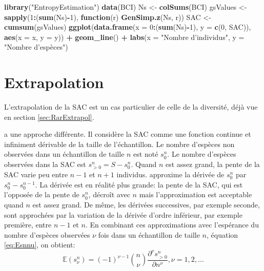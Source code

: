 \documentclass[
  11pt,
  french,
  a4paper,
  extrafontsizes,onecolumn,openright
  ]{memoir}
\newenvironment{Shaded}{\begin{snugshade}}{\end{snugshade}}
\newcommand{\ControlFlowTok}[1]{\textcolor[rgb]{0.13,0.29,0.53}{\textbf{#1}}}
\newcommand{\DataTypeTok}[1]{\textcolor[rgb]{0.13,0.29,0.53}{#1}}
\newcommand{\DecValTok}[1]{\textcolor[rgb]{0.00,0.00,0.81}{#1}}
\newcommand{\KeywordTok}[1]{\textcolor[rgb]{0.13,0.29,0.53}{\textbf{#1}}}
\newcommand{\NormalTok}[1]{#1}
\newcommand{\OperatorTok}[1]{\textcolor[rgb]{0.81,0.36,0.00}{\textbf{#1}}}
\newcommand{\StringTok}[1]{\textcolor[rgb]{0.31,0.60,0.02}{#1}}
\begin{document}
\scriptsize

\begin{Shaded}
\begin{Highlighting}[]
\KeywordTok{library}\NormalTok{(}\StringTok{"EntropyEstimation"}\NormalTok{)}
\KeywordTok{data}\NormalTok{(BCI)}
\NormalTok{Ns <-}\StringTok{ }\KeywordTok{colSums}\NormalTok{(BCI)}
\NormalTok{gsValues <-}\StringTok{ }\KeywordTok{sapply}\NormalTok{(}\DecValTok{1}\OperatorTok{:}\NormalTok{(}\KeywordTok{sum}\NormalTok{(Ns)}\OperatorTok{-}\DecValTok{1}\NormalTok{), }\ControlFlowTok{function}\NormalTok{(r) }\KeywordTok{GenSimp.z}\NormalTok{(Ns, r))}
\NormalTok{SAC <-}\StringTok{ }\KeywordTok{cumsum}\NormalTok{(gsValues)}
\KeywordTok{ggplot}\NormalTok{(}\KeywordTok{data.frame}\NormalTok{(}\DataTypeTok{x =} \DecValTok{0}\OperatorTok{:}\NormalTok{(}\KeywordTok{sum}\NormalTok{(Ns)}\OperatorTok{-}\DecValTok{1}\NormalTok{), }
                  \DataTypeTok{y =} \KeywordTok{c}\NormalTok{(}\DecValTok{0}\NormalTok{, SAC)), }
       \KeywordTok{aes}\NormalTok{(}\DataTypeTok{x =}\NormalTok{ x, }\DataTypeTok{y =}\NormalTok{ y)) }\OperatorTok{+}
\StringTok{  }\KeywordTok{geom_line}\NormalTok{() }\OperatorTok{+}
\StringTok{  }\KeywordTok{labs}\NormalTok{(}\DataTypeTok{x =} \StringTok{"Nombre d'individus"}\NormalTok{, }\DataTypeTok{y =} \StringTok{"Nombre d'espèces"}\NormalTok{)}
\end{Highlighting}
\end{Shaded}

\normalsize

\hypertarget{sec:Extrapolation}{%
\section{Extrapolation}\label{sec:Extrapolation}}

L'extrapolation de la SAC est un cas particulier de celle de la diversité, déjà vue en section \ref{sec:RarExtrapol}.

\textcite{Beguinot2015} a une approche différente.
Il considère la SAC comme une fonction continue et infiniment dérivable de la taille de l'échantillon.
Le nombre d'espèces non observées dans un échantillon de taille \(n\) est noté \(s^{n}_{0}\).
Le nombre d'espèces observées dans la SAC est \(s^{n}_{>0} = S - s^{n}_{0}\).
Quand \(n\) est assez grand, la pente de la SAC varie peu entre \(n-1\) et \(n+1\) individus.
\textcite{Beguinot2014} approxime la dérivée de \(s^{n}_{0}\) par \(s^{n}_{0}-s^{n-1}_{0}\).
La dérivée est en réalité plus grande: la pente de la SAC, qui est l'opposée de la pente de \(s^{n}_{0}\), décroît avec \(n\) mais l'approximation est acceptable quand \(n\) est assez grand.
De même, les dérivées successives, par exemple seconde, sont approchées par la variation de la dérivée d'ordre inférieur, par exemple première, entre \(n-1\) et \(n\).
En combinant ces approximations avec l'espérance du nombre d'espèces observées \(\nu\) fois dans un échantillon de taille \(n\), équation \eqref{eq:Esnnu}, on obtient:
\begin{equation}
  \label{eq:Beguinot2014}
  {\mathbb E}\left( s^{n}_{\nu} \right) 
  = \left(-1 \right)^{\nu-1} \binom{n}{\nu} \frac{\partial^\nu s^{n}_{>0}}{\partial n^\nu}, \nu=1,2,\dots
\end{equation}
\end{document}
